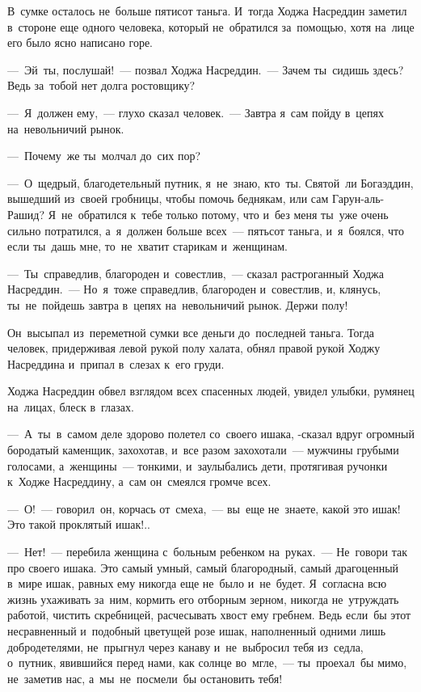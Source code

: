 \documentclass[12pt,a4paper]{book}
\begin{document}
В~сумке осталось не~больше пятисот таньга. И~тогда Ходжа Насреддин заметил в~стороне еще одного человека, который не~обратился за~помощью, хотя на~лице его было ясно написано горе.

—~Эй~ты, послушай!~— позвал Ходжа Насреддин.~— Зачем ты~сидишь здесь? Ведь за~тобой нет долга ростовщику?

—~Я~должен ему,~— глухо сказал человек.~— Завтра я~сам пойду в~цепях на~невольничий рынок.

—~Почему~же ты~молчал до~сих пор?

—~О~щедрый, благодетельный путник, я~не~знаю, кто~ты. Святой~ли Богаэддин, вышедший из~своей гробницы, чтобы помочь беднякам, или сам Гарун-аль-Рашид? Я~не~обратился к~тебе только потому, что и~без меня ты~уже очень сильно потратился, а~я~должен больше всех~— пятьсот таньга, и~я~боялся, что если ты~дашь мне, то~не~хватит старикам и~женщинам.

—~Ты~справедлив, благороден и~совестлив,~— сказал растроганный Ходжа Насреддин.~— Но~я~тоже справедлив, благороден и~совестлив, и, клянусь, ты~не~пойдешь завтра в~цепях на~невольничий рынок. Держи полу!

Он~высыпал из~переметной сумки все деньги до~последней таньга. Тогда человек, придерживая левой рукой полу халата, обнял правой рукой Ходжу Насреддина и~припал в~слезах к~его груди.

Ходжа Насреддин обвел взглядом всех спасенных людей, увидел улыбки, румянец на~лицах, блеск в~глазах.

—~А~ты~в~самом деле здорово полетел со~своего ишака, -сказал вдруг огромный бородатый каменщик, захохотав, и~все разом захохотали~— мужчины грубыми голосами, а~женщины~— тонкими, и~заулыбались дети, протягивая ручонки к~Ходже Насреддину, а~сам он~смеялся громче всех.

—~О!~— говорил~он, корчась от~смеха,~— вы~еще не~знаете, какой это ишак! Это такой проклятый ишак!..

—~Нет!~— перебила женщина с~больным ребенком на~руках.~— Не~говори так про своего ишака. Это самый умный, самый благородный, самый драгоценный в~мире ишак, равных ему никогда еще не~было и~не~будет. Я~согласна всю жизнь ухаживать за~ним, кормить его отборным зерном, никогда не~утруждать работой, чистить скребницей, расчесывать хвост ему гребнем. Ведь если~бы этот несравненный и~подобный цветущей розе ишак, наполненный одними лишь добродетелями, не~прыгнул через канаву и~не~выбросил тебя из~седла, о~путник, явившийся перед нами, как солнце во~мгле,~— ты~проехал~бы мимо, не~заметив нас, а~мы~не~посмели~бы остановить тебя!
\end{document}

